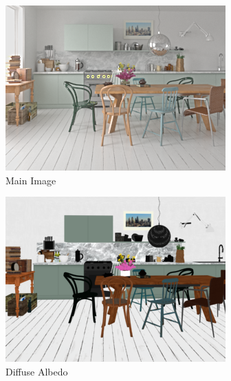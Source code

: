 \begin{figure}
  \centering
  \begin{subfigure}{0.3\linewidth}
    \includegraphics[width=\linewidth]{praca/images/AI43_001_Cam01.png}
    \caption{Main Image}
  \end{subfigure}
  \begin{subfigure}{0.3\linewidth}
    \includegraphics[width=\linewidth]{praca/images/AI43_001_Cam01.VRayRawDiffuseFilter.png}
    \caption{Diffuse Albedo}
  \end{subfigure}
  \begin{subfigure}{0.3\linewidth}

\end{subfigure}
\end{figure}
